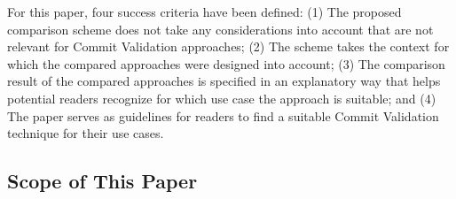 
For this paper, four success criteria have been defined: 
(1) The proposed comparison scheme does not take any considerations into account that are not relevant for Commit Validation approaches;
(2) The 
scheme takes the context for which the compared approaches were designed into account;
(3) The comparison result of the compared approaches is specified in an explanatory way that helps potential readers recognize for which use case the approach is suitable; and
(4) The paper serves as guidelines for readers to find a suitable Commit Validation technique for their use cases.



\subsection{Scope of This Paper}
\label{sec:scope}


